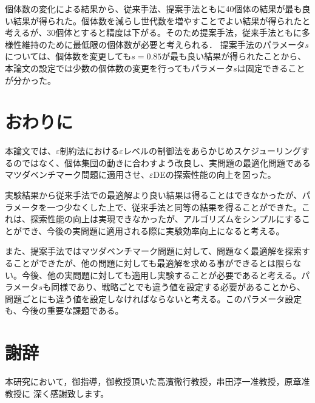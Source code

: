 \documentclass[a4paper,12pt]{jsreport}
\begin{document}
個体数の変化による結果から、従来手法、提案手法ともに40個体の結果が最も良い結果が得られた。個体数を減らし世代数を増やすことでよい結果が得られたと考えるが、30個体とすると精度は下がる。そのため提案手法，従来手法ともに多様性維持のために最低限の個体数が必要と考えられる．
 提案手法のパラメータ$s$については、個体数を変更しても$s=0.85$が最も良い結果が得られたことから、本論文の設定では少数の個体数の変更を行ってもパラメータ$s$は固定できることが分かった。%






\chapter{おわりに}


本論文では、$\varepsilon$制約法における$\varepsilon$レベルの制御法をあらかじめスケジューリングするのではなく、個体集団の動きに合わすよう改良し、実問題の最適化問題であるマツダベンチマーク問題に適用させ、$\varepsilon$DEの探索性能の向上を図った。


実験結果から従来手法での最適解より良い結果は得ることはできなかったが、パラメータを一つ少なくした上で、従来手法と同等の結果を得ることができた。これは、探索性能の向上は実現できなかったが、アルゴリズムをシンプルにすることができ、今後の実問題に適用される際に実験効率向上になると考える。

また、提案手法ではマツダベンチマーク問題に対して、問題なく最適解を探索することができたが、他の問題に対しても最適解を求める事ができるとは限らない。今後、他の実問題に対しても適用し実験することが必要であると考える。パラメータ$s$も同様であり、戦略ごとでも違う値を設定する必要があることから、問題ごとにも違う値を設定しなければならないと考える。このパラメータ設定も、今後の重要な課題である。


\chapter*{謝辞}

本研究において，御指導，御教授頂いた高濱徹行教授，串田淳一准教授，原章准教授に
深く感謝致します。





\end{document}
